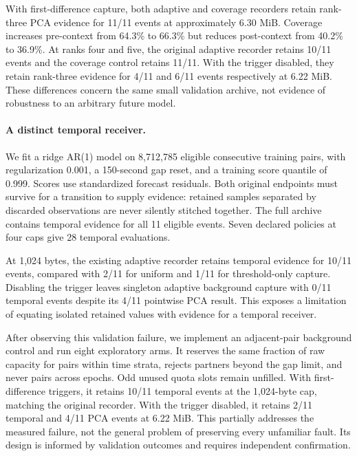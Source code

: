 With first-difference capture, both adaptive and coverage recorders retain
rank-three PCA evidence for 11/11 events at approximately 6.30 MiB. Coverage
increases pre-context from 64.3\% to 66.3\% but reduces post-context from 40.2\%
to 36.9\%. At ranks four and five, the original adaptive recorder retains 10/11
events and the coverage control retains 11/11. With the trigger disabled, they
retain rank-three evidence for 4/11 and 6/11 events respectively at 6.22 MiB.
These differences concern the same small validation archive, not evidence of
robustness to an arbitrary future model.

\paragraph{A distinct temporal receiver.}
We fit a ridge AR(1) model on 8,712,785 eligible consecutive training pairs,
with regularization 0.001, a 150-second gap reset, and a training score quantile
of 0.999. Scores use standardized forecast residuals. Both original endpoints
must survive for a transition to supply evidence: retained samples separated by
discarded observations are never silently stitched together. The full archive
contains temporal evidence for all 11 eligible events. Seven declared policies
at four caps give 28 temporal evaluations.

At 1,024 bytes, the existing adaptive recorder retains temporal evidence for
10/11 events, compared with 2/11 for uniform and 1/11 for threshold-only capture.
Disabling the trigger leaves singleton adaptive background capture with 0/11
temporal events despite its 4/11 pointwise PCA result. This exposes a limitation
of equating isolated retained values with evidence for a temporal receiver.

After observing this validation failure, we implement an adjacent-pair background
control and run eight exploratory arms. It reserves the same fraction of raw
capacity for pairs within time strata, rejects partners beyond the gap limit,
and never pairs across epochs. Odd unused quota slots remain unfilled. With
first-difference triggers, it retains 10/11 temporal events at the 1,024-byte cap,
matching the original recorder. With the trigger disabled, it retains 2/11 temporal
and 4/11 PCA events at 6.22 MiB. This partially addresses the measured failure,
not the general problem of preserving every unfamiliar fault. Its design is
informed by validation outcomes and requires independent confirmation.

\begin{table}[htbp]
\centering
\small

\caption{Temporal receiver comparison at 1,024 bytes per hour. Retained pairs
require consecutive original observations within the gap limit. Burst rows are
exploratory additions after inspecting the temporal validation result.}
\label{tab:temporal}
\end{table}

